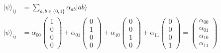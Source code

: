 \begin{align}
|\psi\rangle_{ij} &= \sum_{a,b \in \{0,1\}} \alpha_{ab} |ab\rangle \\
|\psi\rangle_{ij} &= \alpha_{00} \begin{pmatrix} 1 \\ 0 \\ 0 \\ 0 \end{pmatrix} + \alpha_{01} \begin{pmatrix} 0 \\ 1 \\ 0 \\ 0 \end{pmatrix} + \alpha_{10} \begin{pmatrix} 0 \\ 0 \\ 1 \\ 0 \end{pmatrix} + \alpha_{11} \begin{pmatrix} 0 \\ 0 \\ 0 \\ 1 \end{pmatrix} = \begin{pmatrix} \alpha_{00} \\ \alpha_{01} \\ \alpha_{10} \\ \alpha_{11} \end{pmatrix}
\end{align}

